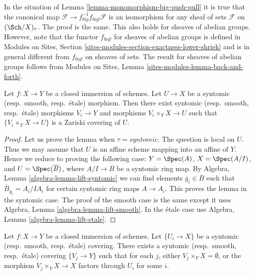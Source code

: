 \begin{remark}
\label{remark-push-pull-shriek}
In the situation of
Lemma \ref{lemma-monomorphism-big-push-pull}
it is true that the canonical map
$\mathcal{F} \to f_{big}^{-1}f_{big!}\mathcal{F}$
is an isomorphism for any sheaf of sets $\mathcal{F}$ on
$(\Sch/X)_\tau$. The proof is the same. This also
holds for sheaves of abelian groups. However, note
that the functor $f_{big!}$ for sheaves of abelian groups is defined in
Modules on Sites, Section \ref{sites-modules-section-exactness-lower-shriek}
and is in general different from $f_{big!}$ on sheaves of sets.
The result for sheaves of abelian groups follows from
Modules on Sites, Lemma \ref{sites-modules-lemma-back-and-forth}.
\end{remark}

\begin{lemma}
\label{lemma-closed-immersion-cover-from-below}
Let $f : X \to Y$ be a closed immersion of schemes.
Let $U \to X$ be a syntomic (resp.\ smooth, resp.\ \'etale) morphism.
Then there exist syntomic (resp.\ smooth, resp.\ \'etale) morphisms
$V_i \to Y$ and morphisms $V_i \times_Y X \to U$ such that
$\{V_i \times_Y X \to U\}$ is a Zariski covering of $U$.
\end{lemma}

\begin{proof}
Let us prove the lemma when $\tau = syntomic$.
The question is local on $U$. Thus we may assume that $U$ is
an affine scheme mapping into an affine of $Y$.
Hence we reduce to proving the following case:
$Y = \Spec(A)$, $X = \Spec(A/I)$, and
$U = \Spec(\overline{B})$, where
$A/I \to \overline{B}$ be a syntomic ring map.
By Algebra, Lemma \ref{algebra-lemma-lift-syntomic}
we can find elements $\overline{g}_i \in \overline{B}$
such that
$\overline{B}_{\overline{g}_i} = A_i/IA_i$ for certain syntomic ring maps
$A \to A_i$.
This proves the lemma in the syntomic case.
The proof of the smooth case is the same except it uses
Algebra, Lemma \ref{algebra-lemma-lift-smooth}.
In the \'etale case use
Algebra, Lemma \ref{algebra-lemma-lift-etale}.
\end{proof}

\begin{lemma}
\label{lemma-prepare-closed-immersion-almost-cocontinuous}
Let $f : X \to Y$ be a closed immersion of schemes.
Let $\{U_i \to X\}$ be a syntomic (resp.\ smooth, resp.\ \'etale) covering.
There exists a syntomic (resp.\ smooth, resp.\ \'etale) covering $\{V_j \to Y\}$
such that for each $j$, either $V_j \times_Y X = \emptyset$, or the
morphism $V_j \times_Y X \to X$ factors through $U_i$ for some $i$.
\end{lemma}

